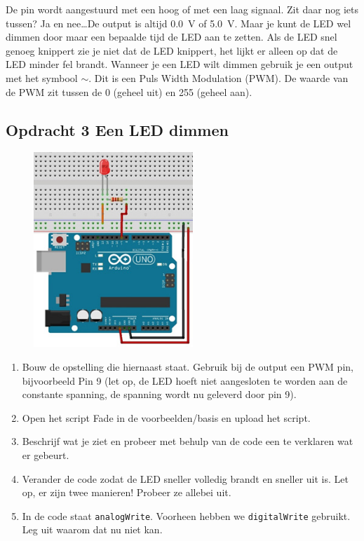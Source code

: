 \documentclass{arduino}
\begin{document}
De pin wordt aangestuurd met een hoog of met een laag signaal. Zit daar nog iets tussen? Ja en nee\dots De output is altijd \SI{0.0}{\volt} of \SI{5.0}{\volt}. Maar je kunt de LED wel dimmen door maar een bepaalde tijd de LED aan te zetten. Als de LED snel genoeg knippert zie je niet dat de LED knippert, het lijkt er alleen op dat de LED minder fel brandt. Wanneer je een LED wilt dimmen gebruik je een output met het symbool $\sim$. Dit is een Puls Width Modulation (PWM). De waarde van de PWM zit tussen de 0 (geheel uit) en 255 (geheel aan).


\subsection{Opdracht 3 Een LED dimmen}

\begin{figure}
\raggedleft
\includegraphics[width=6cm]{14. Circuit dimmable LED}
\end{figure}

\begin{enumerate}[label={\alph*})]
\item Bouw de opstelling die hiernaast staat.  Gebruik bij de output een PWM pin, bijvoorbeeld Pin 9 (let op, de LED hoeft niet aangesloten te worden aan de constante spanning, de spanning wordt nu geleverd door pin 9).

\item Open het script Fade in de voorbeelden/basis en upload het script.

\item Beschrijf wat je ziet en probeer met behulp van de code een te verklaren wat er gebeurt.

\item Verander de code zodat de LED sneller volledig brandt en sneller uit is. Let op, er zijn twee manieren! Probeer ze allebei uit.

\item In de code staat \lstinline{analogWrite}. Voorheen hebben we \lstinline{digitalWrite} gebruikt. Leg uit waarom dat nu niet kan.
\end{enumerate}
\end{document}
